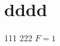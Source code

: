 \documentclass[11pt]{exam}%
\begin{document}
%
\pagestyle{empty}%
\command%
\section{dddd}%
111%
222%
$F= 1$

%
\end{document}
